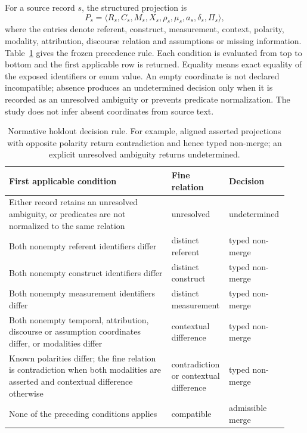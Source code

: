 For a source record $s$, the structured projection is
\begin{equation}
P_s=\langle R_s,C_s,M_s,X_s,\rho_s,\mu_s,a_s,\delta_s,\Pi_s\rangle,
\end{equation}
where the entries denote referent, construct, measurement, context, polarity,
modality, attribution, discourse relation and assumptions or missing
information. Table~\ref{tab:decision-rule} gives the frozen precedence rule.
Each condition is evaluated from top to bottom and the first applicable row is
returned. Equality means exact equality of the exposed identifiers or enum
value. An empty coordinate is not declared incompatible; absence produces an
undetermined decision only when it is recorded as an unresolved ambiguity or
prevents predicate normalization. The study does not infer absent coordinates
from source text.

\begin{table}[H]
\centering
\scriptsize
\begin{tabular}{@{}p{0.58\linewidth}p{0.19\linewidth}p{0.16\linewidth}@{}}
\toprule
\textbf{First applicable condition} & \textbf{Fine relation} & \textbf{Decision} \\
\midrule
Either record retains an unresolved ambiguity, or predicates are not normalized
to the same relation & unresolved & undetermined \\
Both nonempty referent identifiers differ & distinct referent & typed non-merge \\
Both nonempty construct identifiers differ & distinct construct & typed non-merge \\
Both nonempty measurement identifiers differ & distinct measurement & typed non-merge \\
Both nonempty temporal, attribution, discourse or assumption coordinates differ,
or modalities differ & contextual difference & typed non-merge \\
Known polarities differ; the fine relation is contradiction when both modalities
are asserted and contextual difference otherwise & contradiction or contextual
difference & typed non-merge \\
None of the preceding conditions applies & compatible & admissible merge \\
\bottomrule
\end{tabular}
\caption{Normative holdout decision rule. For example, aligned asserted
projections with opposite polarity return contradiction and hence typed
non-merge; an explicit unresolved ambiguity returns undetermined.}
\label{tab:decision-rule}
\end{table}

